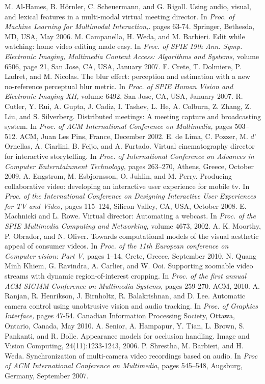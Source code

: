 \documentclass{sig-alternate-05-2015}
\begin{document}
\begin{thebibliography}{9}
M. Al-Hames, B. Hörnler, C. Scheuermann, and G. Rigoll.
Using audio, visual, and lexical features in a multi-modal
virtual meeting director. In 
\textit{Proc. of Machine Learning for
Multimodal Interaction,}.
pages 63-74. Springer, Bethesda,
MD, USA, May 2006.
M. Campanella, H. Weda, and M. Barbieri. Edit while
watching: home video editing made easy. In \textit{Proc. of SPIE
19th Ann. Symp. Electronic Imaging, Multimedia Content
Access: Algorithms and Systems,} volume 6506, page 21, San
Jose, CA, USA, January 2007.
F. Crete, T. Dolmiere, P. Ladret, and M. Nicolas. The blur
effect: perception and estimation with a new no-reference
perceptual blur metric. In \textit{Proc. of SPIE Human Vision and
Electronic Imaging XII,} volume 6492, San Jose, CA, USA,
January 2007.
R. Cutler, Y. Rui, A. Gupta, J. Cadiz, I. Tashev, L. He,
A. Colburn, Z. Zhang, Z. Liu, and S. Silverberg. Distributed
meetings: A meeting capture and broadcasting system. In
\textit{Proc. of ACM International Conference on Multimedia,}
pages 503–512. ACM, Juan Les Pins, France, December
2002.
 E. de Lima, C. Pozzer, M. $d’$Ornellas, A. Ciarlini, B. Feijo,
and A. Furtado. Virtual cinematography director for
interactive storytelling. In \textit{Proc. of International Conference
on Advances in Computer Enterntainment Technology,} pages
263–270, Athens, Greece, October 2009.
A. Engstrom, M. Esbjornsson, O. Juhlin, and M. Perry.
Producing collaborative video: developing an interactive user
experience for mobile tv. In \textit{Proc. of the International
Conference on Designing Interactive User Experiences for
TV and Video, }pages 115–124, Silicon Valley, CA, USA,
October 2008.
 E. Machnicki and L. Rowe. Virtual director: Automating a
webcast. In \textit{Proc. of the SPIE Multimedia Computing and
Networking,} volume 4673, 2002.
A. K. Moorthy, P. Obrador, and N. Oliver. Towards
computational models of the visual aesthetic appeal of
consumer videos. In \textit{Proc. of the 11th European conference
on Computer vision: Part V,} pages 1–14, Crete, Greece,
September 2010.
 N. Quang Minh Khiem, G. Ravindra, A. Carlier, and W. Ooi.
Supporting zoomable video streams with dynamic
region-of-interest cropping. In \textit{Proc. of the first annual ACM
SIGMM Conference on Multimedia Systems, }pages 259-270.
ACM, 2010.
 A. Ranjan, R. Henrikson, J. Birnholtz, R. Balakrishnan, and
D. Lee. Automatic camera control using unobtrusive vision
and audio tracking. In \textit{Proc. of Graphics Interface,} pages
47-54. Canadian Information Processing Society, Ottawa,
Ontario, Canada, May 2010.
 A. Senior, A. Hampapur, Y. Tian, L. Brown, S. Pankanti, and
R. Bolle. Appearance models for occlusion handling. Image
and Vision Computing, 24(11):1233-1243, 2006.
 P. Shrestha, M. Barbieri, and H. Weda. Synchronization of
multi-camera video recordings based on audio. In\textit{ Proc of
ACM International Conference on Multimedia,} pages
545–548, Augsburg, Germany, September 2007.

\end{thebibliography}
\end{document}
